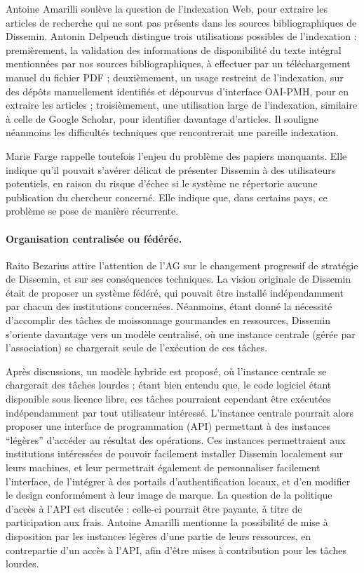 \documentclass{scrartcl}
\begin{document}
Antoine Amarilli soulève la question de l'indexation Web, pour extraire les
articles de recherche qui ne sont pas présents dans les sources bibliographiques
de Dissemin. Antonin Delpeuch distingue trois utilisations possibles de
l'indexation : premièrement, la validation des informations de disponibilité du
texte intégral mentionnées par nos sources bibliographiques, à effectuer par un
téléchargement manuel du fichier PDF ; deuxièmement,
un usage restreint de l'indexation, sur des dépôts
manuellement identifiés et dépourvus d'interface OAI-PMH, pour en extraire les
articles ; troisièmement, une utilisation large de l'indexation, similaire à
celle de Google Scholar, pour identifier davantage d'articles. Il souligne
néanmoins les difficultés techniques que rencontrerait une pareille indexation.

Marie Farge rappelle toutefois l'enjeu du problème des papiers manquants. Elle
indique qu'il pouvait s'avérer délicat de présenter Dissemin à des utilisateurs
potentiels, en raison du risque d'échec si le système ne répertorie aucune
publication du chercheur concerné. Elle indique que, dans certains pays, ce
problème se pose de manière récurrente.

\paragraph{Organisation centralisée ou fédérée.}
Raito Bezarius attire l'attention de l'AG sur le changement progressif de
stratégie de Dissemin, et sur ses conséquences techniques. La vision originale
de Dissemin était de proposer un système fédéré, qui pouvait être installé
indépendamment par chacun des institutions concernées. Néanmoins, étant donné la
nécessité d'accomplir des tâches de moissonnage gourmandes en ressources,
Dissemin s'oriente davantage vers un modèle centralisé, où une instance centrale
(gérée par l'association) se chargerait seule de l'exécution de ces tâches. 

Après discussions, un modèle hybride est proposé, où l'instance centrale se
chargerait des tâches lourdes ; étant bien entendu que, le code logiciel étant
disponible sous licence libre, ces tâches pourraient cependant être exécutées
indépendamment par tout utilisateur intéressé. L'instance centrale pourrait alors
proposer une interface de programmation (API) permettant à des instances
``légères'' d'accéder au résultat des opérations. Ces instances permettraient
aux institutions intéressées de pouvoir facilement installer Dissemin localement
sur leurs machines, et leur permettrait également de personnaliser facilement
l'interface, de l'intégrer à des portails d'authentification locaux, et d'en
modifier le design conformément à leur image de marque. La question de la
politique d'accès à l'API est discutée : celle-ci pourrait être payante, à titre
de participation aux frais. Antoine Amarilli mentionne la possibilité de mise à
disposition par les instances légères d'une partie de leurs ressources, en
contrepartie d'un accès à l'API, afin d'être mises à contribution pour les
tâches lourdes.
\end{document}
